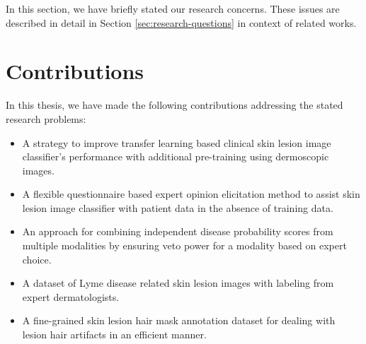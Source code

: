 In this section, we have briefly stated our research concerns. These issues are described in detail in Section \ref{sec:research-questions} in context of related works.


\section{Contributions}
In this thesis, we have made the following contributions addressing the stated research problems:

\begin{itemize}
	
	\item A strategy to improve transfer learning based clinical skin lesion image classifier's performance with additional pre-training using dermoscopic images.
	
	\item A flexible questionnaire based expert opinion elicitation method to assist skin lesion image classifier with patient data in the absence of training data.
	
	\item An approach for combining independent disease probability scores from multiple modalities by ensuring veto power for a modality based on expert choice.
	
	\item A dataset of Lyme disease related skin lesion images with labeling from expert dermatologists.
	
	\item A fine-grained skin lesion hair mask annotation dataset for dealing with lesion hair artifacts in an efficient manner.
	
\end{itemize}

